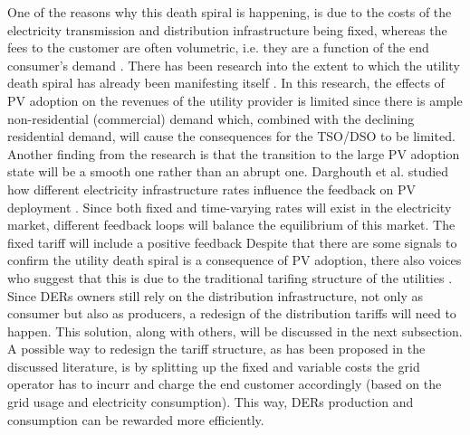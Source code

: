 One of the reasons why this death spiral is happening, is due to the costs of the electricity transmission and distribution infrastructure being fixed, whereas the fees to the customer are often volumetric, i.e. they are a function of the end consumer's demand \cite{spiral2}. There has been research into the extent to which the utility death spiral has already been manifesting itself \cite{spiral3}. In this research, the effects of PV adoption on the revenues of the utility provider is limited since there is ample non-residential (commercial) demand which, combined with the declining residential demand, will cause the consequences for the TSO/DSO to be limited. Another finding from the research is that the transition to the large PV adoption state will be a smooth one rather than an abrupt one. Darghouth et al. studied how different electricity infrastructure rates influence the feedback on PV deployment \cite{fixedvar}. Since both fixed and time-varying rates will exist in the electricity market, different feedback loops will balance the equilibrium of this market. The fixed tariff will include a positive feedback
\newline \newline \noindent
Despite that there are some signals to confirm the utility death spiral is a consequence of PV adoption, there also voices who suggest that this is due to the traditional tarifing structure of the utilities \cite{spiral4}. Since DERs owners still rely on the distribution infrastructure, not only as consumer but also as producers, a redesign of the distribution tariffs will need to happen. This solution, along with others, will be discussed in the next subsection. A possible way to redesign the tariff structure, as has been proposed in the discussed literature, is by splitting up the fixed and variable costs the grid operator has to incurr and charge the end customer accordingly (based on the grid usage and electricity consumption). This way, DERs production and consumption can be rewarded more efficiently. 
